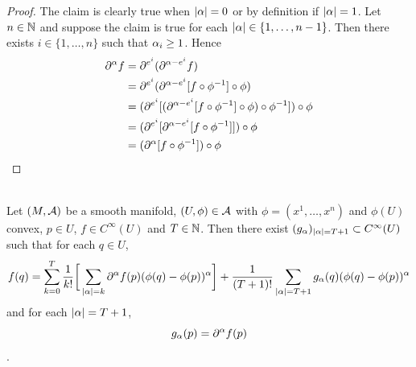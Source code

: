 \documentclass{book}
\begin{document}
\begin{proof}
	The claim is clearly true when $|\alpha| =0$ or by definition if $|\alpha| = 1$. Let $n \in \mathbb{N}$ and suppose the claim is true for each $|\alpha| \in \{1, \ldots, n-1 \}$. Then there exists $i \in \{1, \ldots, n\}$ such that $\alpha_i \geq 1$. Hence 
	\begin{align*}
		\partial^{\alpha}f 
		& = \partial^{e^i} (\partial^{\alpha - e^i} f) \\
		& = \partial^{e^i} (\partial^{\alpha - e^i}[ f \circ \phi^{-1}] \circ \phi) \\
		& = (\partial^{e^i} [(\partial^{\alpha - e^i}[ f \circ \phi^{-1}] \circ \phi) \circ \phi^{-1} ]) \circ \phi\\
		& = (\partial^{e^i} [\partial^{\alpha - e^i}[ f \circ \phi^{-1}]] )\circ \phi\\
		& = (\partial^{\alpha}[ f \circ \phi^{-1}] )\circ \phi\\
	\end{align*}
\end{proof}


\begin{ex}   \\
	Let $(M, \mathcal{A})$ be a smooth manifold, $(U, \phi) \in \mathcal{A}$ with $\phi = (x^1, \ldots, x^n)$ and $\phi(U)$ convex, $p \in U$, $f \in C^{\infty}(U)$ and $T \in \mathbb{N}$. Then there exist $(g_{\alpha})_{|\alpha| = T+1} \subset C^{\infty}(U)$ such that for each $q \in U$,
	$$f(q) = \sum_{k=0}^{T} \frac{1}{k!} \bigg[\sum_{|\alpha| = k} \partial^{\alpha} f (p) ( \phi(q) - \phi(p))^{\alpha} \bigg] + \frac{1}{(T+1)!} \sum_{|\alpha| = T+1} g_{\alpha}(q) (\phi(q) - \phi(p))^{\alpha} $$ and for each $|\alpha|= T+1$, $$g_{\alpha}(p) = \partial^{\alpha} f(p)$$
	.
\end{ex}
\end{document}
